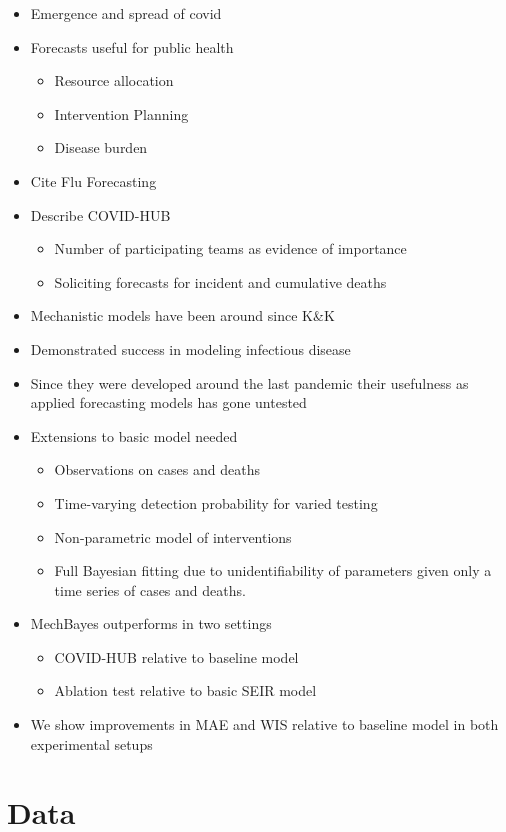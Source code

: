 \documentclass[11pt]{amsart}
\begin{document}
\begin{itemize}
\item Emergence and spread of covid
\item Forecasts useful for public health
\begin{itemize}
\item Resource allocation
\item Intervention Planning
\item Disease burden
\end{itemize}
\item Cite Flu Forecasting
\item Describe COVID-HUB
\begin{itemize}
\item Number of participating teams as evidence of importance
\item Soliciting forecasts for incident and cumulative deaths
\end{itemize}
\item Mechanistic models have been around since K\&K
\item Demonstrated success in modeling infectious disease 
\item Since they were developed around the last pandemic their usefulness as applied forecasting models has gone untested
\item Extensions to basic model needed 
\begin{itemize}
\item Observations on cases and deaths
\item Time-varying detection probability for varied testing
\item Non-parametric model of interventions
\item Full Bayesian fitting due to unidentifiability of parameters given only a time series of cases and deaths.
\end{itemize}
\item MechBayes outperforms in two settings
\begin{itemize}
\item COVID-HUB relative to baseline model 
\item Ablation test relative to basic SEIR model
\end{itemize}
\item We show improvements in MAE and WIS relative to baseline model in both experimental setups

\end{itemize}

\section{Data}
\end{document}
